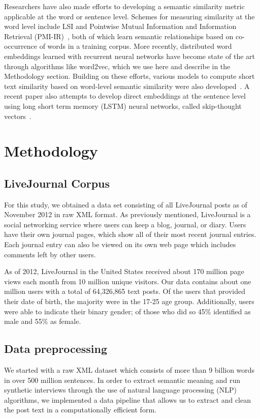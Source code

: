 \documentclass{sigchi}
\begin{document}
Researchers have also made efforts to developing a semantic similarity metric applicable at the word or sentence level. Schemes for measuring similarity at the word level include LSI and Pointwise Mutual Information and Information Retrieval (PMI-IR)~\cite{turney2001}, both of which learn semantic relationships based on co-occurrence of words in a training corpus. More recently, distributed word embeddings learned with recurrent neural networks have become state of the art through algorithms like word2vec, which we use here and describe in the Methodology section. Building on these efforts, various models to compute short text similarity  based on  word-level semantic similarity were also developed~\cite{mihalcea2006,kenter15short}. A recent paper also attempts to develop direct embeddings at the sentence level using long short term memory (LSTM) neural networks, called skip-thought vectors~\cite{kiros2015skip}. 

\section{Methodology}

\subsection{LiveJournal Corpus}
For this study, we obtained a data set consisting of all LiveJournal posts as of November 2012 in raw XML format. As previously mentioned, LiveJournal is a social networking service where users can keep a blog, journal, or diary. Users have their own journal pages, which show all of their most recent journal entries. Each journal entry can also be viewed on its own web page which includes comments left by other users. 

As of 2012, LiveJournal in the United States received about 170 million page views each month from 10 million unique visitors. Our data contains about one million users with a total of 64,326,865 text posts. Of the users that provided their date of birth, the majority were in the 17-25 age group. Additionally, users were able to indicate their binary gender; of those who did so 45\% identified as male and 55\% as female. 

\subsection{Data preprocessing}

We started with a raw XML dataset which consists of more than 9 billion words in over 500 million sentences. In order to extract semantic meaning and run synthetic interviews through the use of natural language processing (NLP) algorithms, we implemented a data pipeline that allows us to extract and clean the post text in a computationally efficient form. 
\end{document}
